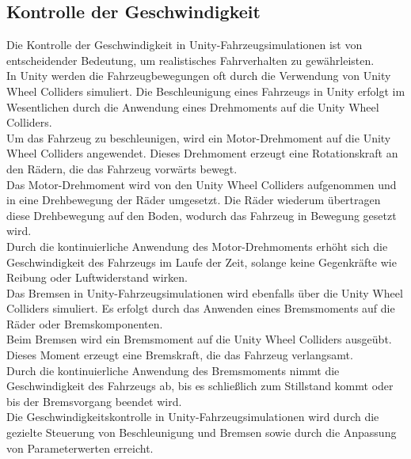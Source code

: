 \subsection{Kontrolle der Geschwindigkeit}
Die Kontrolle der Geschwindigkeit in Unity-Fahrzeugsimulationen ist von entscheidender Bedeutung, um realistisches Fahrverhalten zu gewährleisten.\\

In Unity werden die Fahrzeugbewegungen oft durch die Verwendung von Unity Wheel Colliders simuliert. Die Beschleunigung eines Fahrzeugs in Unity erfolgt im Wesentlichen durch die Anwendung eines Drehmoments auf die Unity Wheel Colliders.\\

Um das Fahrzeug zu beschleunigen, wird ein Motor-Drehmoment auf die Unity Wheel Colliders angewendet. Dieses Drehmoment erzeugt eine Rotationskraft an den Rädern, die das Fahrzeug vorwärts bewegt.\\

Das Motor-Drehmoment wird von den Unity Wheel Colliders aufgenommen und in eine Drehbewegung der Räder umgesetzt. Die Räder wiederum übertragen diese Drehbewegung auf den Boden, wodurch das Fahrzeug in Bewegung gesetzt wird.\\

Durch die kontinuierliche Anwendung des Motor-Drehmoments erhöht sich die Geschwindigkeit des Fahrzeugs im Laufe der Zeit, solange keine Gegenkräfte wie Reibung oder Luftwiderstand wirken.\\

Das Bremsen in Unity-Fahrzeugsimulationen wird ebenfalls über die Unity Wheel Colliders simuliert. Es erfolgt durch das Anwenden eines Bremsmoments auf die Räder oder Bremskomponenten.\\

Beim Bremsen wird ein Bremsmoment auf die Unity Wheel Colliders ausgeübt. Dieses Moment erzeugt eine Bremskraft, die das Fahrzeug verlangsamt.\\

Durch die kontinuierliche Anwendung des Bremsmoments nimmt die Geschwindigkeit des Fahrzeugs ab, bis es schließlich zum Stillstand kommt oder bis der Bremsvorgang beendet wird.\\

Die Geschwindigkeitskontrolle in Unity-Fahrzeugsimulationen wird durch die gezielte Steuerung von Beschleunigung und Bremsen sowie durch die Anpassung von Parameterwerten erreicht.\\

